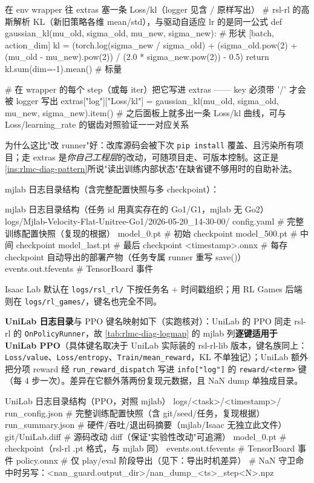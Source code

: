 \begin{codebox}[Python]{在 env wrapper 往 extras 塞一条 Loss/kl（logger 见含 / 原样写出）}
# rsl-rl 的高斯解析 KL（新旧策略各维 mean/std），与驱动自适应 lr 的是同一公式
def gaussian_kl(mu_old, sigma_old, mu_new, sigma_new):  # 形状 [batch, action_dim]
    kl = (torch.log(sigma_new / sigma_old)
          + (sigma_old.pow(2) + (mu_old - mu_new).pow(2)) / (2.0 * sigma_new.pow(2))
          - 0.5)
    return kl.sum(dim=-1).mean()  # 标量

# 在 wrapper 的每个 step（或每 iter）把它写进 extras —— key 必须带 '/' 才会被 logger 写出
extras["log"]["Loss/kl"] = gaussian_kl(mu_old, sigma_old, mu_new, sigma_new).item()
# 之后面板上就多出一条 Loss/kl 曲线，可与 Loss/learning_rate 的锯齿对照验证一一对应关系
\end{codebox}

为什么这比"改 runner"好：改库源码会被下次 \verb|pip install| 覆盖、且污染所有项目；走 extras 是\emph{你自己工程层}的改动，可随项目走、可版本控制。这正是\cref{ins:rlmc-diag-pattern}所说"读出训练内部状态"在缺省键不够用时的自助补法。

mjlab 日志目录结构（含完整配置快照与多 checkpoint）：

\begin{codebox}[text]{mjlab 日志目录结构（任务 id 用真实存在的 Go1/G1，mjlab 无 Go2）}
logs/Mjlab-Velocity-Flat-Unitree-Go1/2026-05-20_14-30-00/
  config.yaml          # 完整训练配置快照（复现的根据）
  model_0.pt           # 初始 checkpoint
  model_500.pt         # 中间 checkpoint
  model_last.pt        # 最后 checkpoint
  <timestamp>.onnx     # 每存 checkpoint 自动导出的部署产物（任务专属 runner 重写 save()）
  events.out.tfevents  # TensorBoard 事件
\end{codebox}

Isaac Lab 默认在 \verb|logs/rsl_rl/| 下按任务名 $+$ 时间戳组织；用 RL Games 后端则在 \verb|logs/rl_games/|，键名也完全不同。

\textbf{UniLab 日志目录}与 PPO 键名映射如下（实跑核对）：UniLab 的 PPO 同走 rsl-rl 的 \verb|OnPolicyRunner|，故 \cref{tab:rlmc-diag-logmap} 的 mjlab 列\textbf{逐键适用于 UniLab PPO}（具体键名取决于 UniLab 实际装的 rsl-rl-lib 版本，键名族同上：\verb|Loss/value|、\verb|Loss/entropy|、\verb|Train/mean_reward|，KL 不单独记）；UniLab 额外把分项 reward 经 \verb|run_reward_dispatch| 写进 \verb|info["log"]| 的 \verb|reward/<term>| 键（每 4 步一次）。差异在它额外落两份复现元数据，且 NaN dump 单独成目录。

\begin{codebox}[text]{UniLab 日志目录结构（PPO，对照 mjlab）}
logs/<task>/<timestamp>/
  run_config.json      # 完整训练配置快照（含 git/seed/任务，复现根据）
  run_summary.json     # 硬件/吞吐/退出码摘要（mjlab/Isaac 无独立此文件）
  git/UniLab.diff      # 源码改动 diff（保证"实验性改动"可追溯）
  model_0.pt           # checkpoint（rsl-rl .pt 格式，与 mjlab 同）
  events.out.tfevents  # TensorBoard 事件
  policy.onnx          # 仅 play/eval 阶段导出（见下：导出时机差异）
# NaN 守卫命中时另写：<nan_guard.output_dir>/nan_dump_<ts>_step<N>.npz
\end{codebox}

